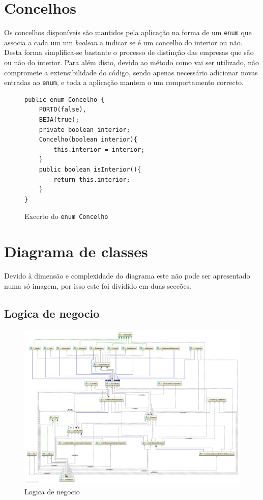 \documentclass[12pt,a4paper]{report}
\begin{document}
\section{Concelhos}
\label{sec:concelho}
    Os concelhos disponíveis são mantidos pela aplicação na forma de um
    \texttt{enum} que associa a cada um um \textit{boolean} a indicar se
    é um concelho do interior ou não. Desta forma simplifica-se bastante o processo
    de distinção das empresas que são ou não do interior. Para além disto, devido
    ao método como vai ser utilizado, não compromete a extensibilidade do código,
    sendo apenas necessário adicionar novas entradas ao \texttt{enum}, e
    toda a aplicação mantem o um comportamento correcto.

    \begin{figure}[h]
        \begin{verbatim}
public enum Concelho {
    PORTO(false),
    BEJA(true);
    private boolean interior;
    Concelho(boolean interior){
        this.interior = interior;
    }
    public boolean isInterior(){
        return this.interior;
    }
}
        \end{verbatim}
        \caption{Excerto do \texttt{enum Concelho}}
        \label{fig:concelhos}
    \end{figure}

\section{Diagrama de classes}
    Devido à dimensão e complexidade do diagrama este não pode ser apresentado numa só imagem,
    por isso este foi dividido em duas seccões.
    \subsection{Logica de negocio}
    \begin{figure}[H]
        \centering
        \includegraphics[width=\textwidth]{./images/businessFull.png}
        \caption{Logica de negocio}
    \end{figure}
\end{document}
